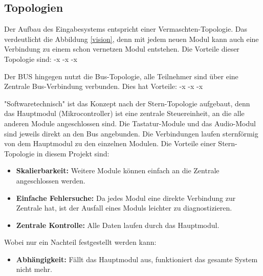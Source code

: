  
 \subsection{Topologien}
 Der Aufbau des Eingabesystems entspricht einer Vermaschten-Topologie. Das verdeutlicht die Abbildung \ref{vision}, denn mit jedem neuen Modul kann auch eine Verbindung zu einem schon vernetzen Modul entstehen. Die Vorteile dieser Topologie sind:
 -x
 -x
 -x
 
 Der BUS hingegen nutzt die Bus-Topologie, alle Teilnehmer sind über eine Zentrale Bus-Verbindung verbunden. Dies hat Vorteile:
 -x
 -x
 -x
 
 
 
 
"Softwaretechnisch" ist das Konzept nach der Stern-Topologie aufgebaut, denn das Hauptmodul (Mikrocontroller) ist eine zentrale Steuereinheit, an die alle anderen Module angeschlossen sind. Die Tastatur-Module und das Audio-Modul sind jeweils direkt an den Bus angebunden. Die Verbindungen laufen sternförmig von dem Hauptmodul zu den einzelnen Modulen. Die Vorteile einer Stern-Topologie in diesem Projekt sind:
\begin{itemize}
    \item \textbf{Skalierbarkeit:} Weitere Module können einfach an die Zentrale angeschlossen werden.
    \item \textbf{Einfache Fehlersuche:} Da jedes Modul eine direkte Verbindung zur Zentrale hat, ist der Ausfall eines Moduls leichter zu diagnostizieren.
    \item \textbf{Zentrale Kontrolle:} Alle Daten laufen durch das Hauptmodul.
\end{itemize}
Wobei nur ein Nachteil festgestellt werden kann:
\begin{itemize}
    \item \textbf{Abhängigkeit:} Fällt das Hauptmodul aus, funktioniert das gesamte System nicht mehr.
\end{itemize}
